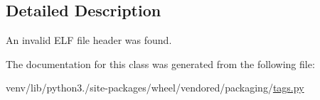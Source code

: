 \subsection{Detailed Description}
\begin{DoxyVerb}An invalid ELF file header was found.
\end{DoxyVerb}
 

The documentation for this class was generated from the following file\+:\begin{DoxyCompactItemize}
\item 
venv/lib/python3./site-\/packages/wheel/vendored/packaging/\hyperlink{wheel_2vendored_2packaging_2tags_8py}{tags.\+py}\end{DoxyCompactItemize}
